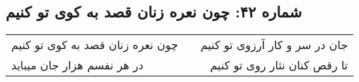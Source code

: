 \begin{center}
\section*{شماره ۴۲: چون نعره زنان قصد به کوی تو کنیم}
\label{sec:042}
\begin{longtable}{l p{0.5cm} r}
چون نعره زنان قصد به کوی تو کنیم
&&
جان در سر و کار آرزوی تو کنیم
\\
در هر نفسم هزار جان میباید
&&
تا رقص کنان نثار روی تو کنیم
\\
\end{longtable}
\end{center}
